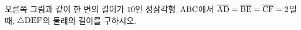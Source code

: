 \noindent\begin{minipage}[t]{0.58\linewidth}\vspace{0pt}\raggedright 오른쪽 그림과 같이 한 변의 길이가 $10$인 정삼각형~$\mathrm{ABC}$에서 $\overline{\mathrm{AD}}=\overline{\mathrm{BE}}=\overline{\mathrm{CF}}=2$일 때, $\triangle\mathrm{DEF}$의 둘레의 길이를 구하시오.\end{minipage}\hfill\begin{minipage}[t]{0.4\linewidth}\vspace{0pt}\centering \resizebox{\ifdim\width>\linewidth\linewidth\else\width\fi}{!}{}\end{minipage}\par
